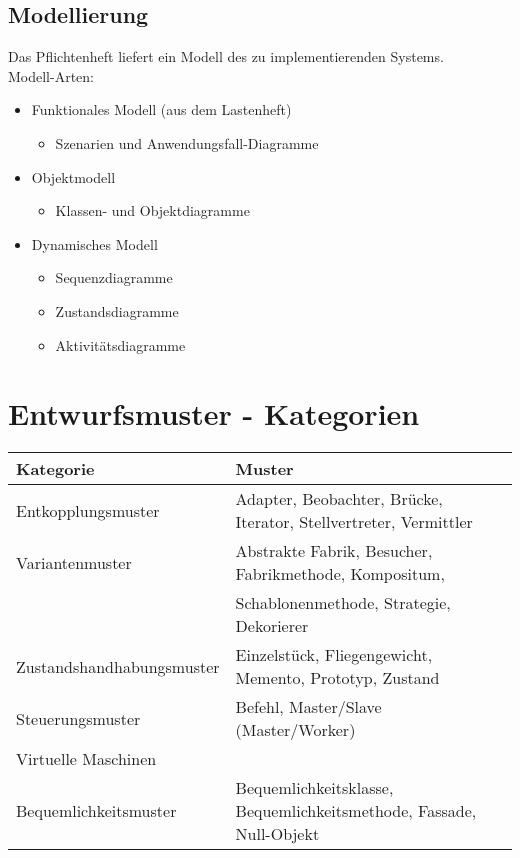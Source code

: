 \documentclass{article}
\newcommand{\important}[1]{\textcolor{importantColor}{#1}}
\begin{document}
\subsection{Modellierung}
Das Pflichtenheft liefert ein Modell des zu implementierenden Systems.\\
Modell-Arten:
\begin{itemize}
    \item \important{Funktionales} Modell (aus dem Lastenheft)
    \begin{itemize}
        \item Szenarien und Anwendungsfall-Diagramme
    \end{itemize}
    \item \important{Objektmodell}
    \begin{itemize}
        \item Klassen- und Objektdiagramme
    \end{itemize}
    \item \important{Dynamisches} Modell
    \begin{itemize}
        \item Sequenzdiagramme
        \item Zustandsdiagramme
        \item Aktivitätsdiagramme
    \end{itemize}
\end{itemize}

\newpage

\section{Entwurfsmuster - Kategorien}
\begin{table}[h]
\begin{tabular}{l|l}
\toprule
Kategorie & Muster   \\\midrule
Entkopplungsmuster & Adapter, Beobachter, Brücke, Iterator, Stellvertreter, Vermittler  \\\hline
Variantenmuster & Abstrakte Fabrik, Besucher, Fabrikmethode, Kompositum, \\& Schablonenmethode, Strategie, Dekorierer \\\hline
Zustandshandhabungsmuster & Einzelstück, Fliegengewicht, Memento, Prototyp, Zustand  \\\hline
Steuerungsmuster & Befehl, Master/Slave (Master/Worker)  \\\hline
Virtuelle Maschinen &   \\\hline
Bequemlichkeitsmuster & Bequemlichkeitsklasse, Bequemlichkeitsmethode, Fassade, Null-Objekt \\\bottomrule
\end{tabular}
\end{table}
\end{document}
